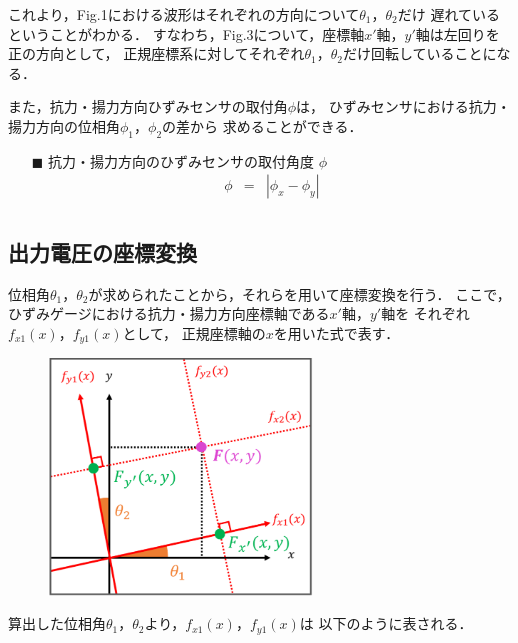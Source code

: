 \documentclass[twocolumn,a4j]{jsarticle}
\begin{document}
これより，Fig.1における波形はそれぞれの方向について$\theta_1$，$\theta_2$だけ
遅れているということがわかる．
すなわち，Fig.3について，座標軸$x'$軸，$y'$軸は左回りを正の方向として，
正規座標系に対してそれぞれ$\theta_1$，$\theta_2$だけ回転していることになる．\par

また，抗力・揚力方向ひずみセンサの取付角$\phi$は，
ひずみセンサにおける抗力・揚力方向の位相角$\phi_1$，$\phi_2$の差から
求めることができる．

\begin{itemize}
    \item [$\blacksquare$] 抗力・揚力方向のひずみセンサの取付角度 $\phi$
          \begin{eqnarray*}
              \phi &=& \left| \phi_x - \phi_y \right| \\
          \end{eqnarray*}
\end{itemize}

\subsection{出力電圧の座標変換}
位相角$\theta_1$，$\theta_2$が求められたことから，それらを用いて座標変換を行う．
ここで，ひずみゲージにおける抗力・揚力方向座標軸である$x'$軸，$y'$軸を
それぞれ$f_{x1}\left(x\right)$，$f_{y1}\left(x\right)$として，
正規座標軸の$x$を用いた式で表す．

\begin{figure}[htbp]
    \footnotesize
    \begin{center}
        \includegraphics[width=70mm]{../images/image_3.png}
        \caption{}
    \end{center}
\end{figure}

算出した位相角$\theta_1$，$\theta_2$より，$f_{x1}\left(x\right)$，$f_{y1}\left(x\right)$は
以下のように表される．
\end{document}
